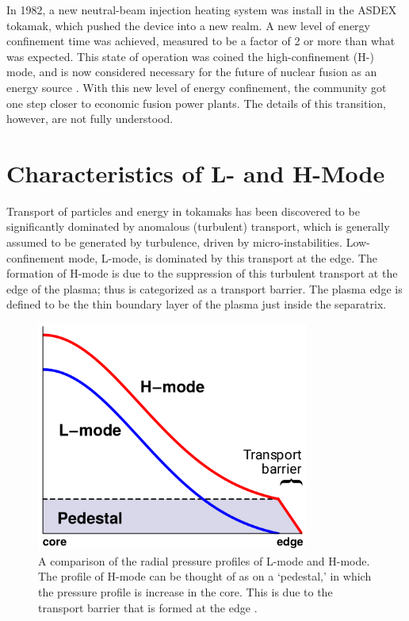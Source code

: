In 1982, a new neutral-beam injection heating system was install in the ASDEX tokamak, which pushed the device into a new realm.
A new level of energy confinement time was achieved, measured to be a factor of 2 or more than what was expected.
This state of operation was coined the high-confinement (H-) mode, and is now considered necessary for the future of nuclear fusion as an energy source \cite{arnoux_how_2009} \cite{wagner_development_1984}.
With this new level of energy confinement, the community got one step closer to economic fusion power plants.
The details of this transition, however, are not fully understood.

\section{Characteristics of L- and H-Mode}
Transport of particles and energy in tokamaks has been discovered to be significantly dominated by anomalous (turbulent) transport, which is generally assumed to be generated by turbulence, driven by micro-instabilities.
Low-confinement mode, L-mode, is dominated by this transport at the edge.
The formation of H-mode is due to the suppression of this turbulent transport at the edge of the plasma; thus is categorized as a transport barrier.
The plasma edge is defined to be the thin boundary layer of the plasma just inside the separatrix.


\begin{figure}[b] %
\begin{minipage}{0.49\linewidth}
	\centering
	\includegraphics[width=0.8\textwidth]{../Graphics/L-mode_H-mode_compare.png}
\end{minipage}
\hfill
\begin{minipage}{0.49\linewidth}
	\caption{A comparison of the radial pressure profiles of L-mode and H-mode.
	The profile of H-mode can be thought of as on a `pedestal,' in which the pressure profile is increase in the core.
	This is due to the transport barrier that is formed at the edge \cite{weymiens_bifurcation_2014}.}
	\label{fig:L-mode_H-mode_compare}
\end{minipage}
\end{figure}

